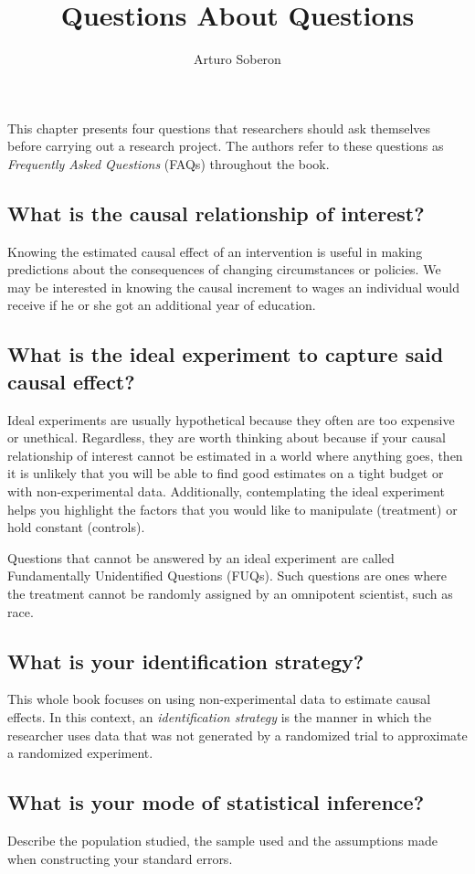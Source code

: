 \documentclass[12pt]{article}
\begin{document}
\title{Questions About Questions}
\author{Arturo Soberon}
\maketitle

This chapter presents four questions that researchers should ask themselves
before carrying out a research project. The authors refer to these questions as
\textit{Frequently Asked Questions} (FAQs) throughout the book.

\subsection{What is the causal relationship of interest?}
Knowing the estimated causal effect of an intervention is useful in making
predictions about the consequences of changing circumstances or policies. We
may be interested in knowing the causal increment to wages an individual would
receive if he or she got an additional year of education.

\subsection{What is the ideal experiment to capture said causal effect?}
Ideal experiments are usually hypothetical because they often are too expensive
or unethical. Regardless, they are worth thinking about because if your causal
relationship of interest cannot be estimated in a world where anything goes,
then it is unlikely that you will be able to find good estimates on a tight
budget or with non-experimental data. Additionally, contemplating the ideal
experiment helps you highlight the factors that you would like to manipulate
(treatment) or hold constant (controls).

Questions that cannot be answered by an ideal experiment are called
Fundamentally Unidentified Questions (FUQs). Such questions are ones where
the treatment cannot be randomly assigned by an omnipotent scientist, such as
race.

\subsection{What is your identification strategy?}
This whole book focuses on using non-experimental data to estimate causal
effects. In this context, an \textit{identification strategy} is the manner
in which the researcher uses data that was not generated by a randomized trial
to approximate a randomized experiment.

\subsection{What is your mode of statistical inference?}
Describe the population studied, the sample used and the assumptions made when
constructing your standard errors.

\end{document}
